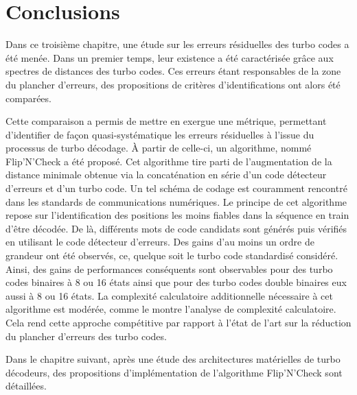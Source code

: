 \section{Conclusions}
Dans ce troisième chapitre, une étude sur les erreurs résiduelles des turbo codes a été menée. Dans un premier temps,
leur existence a été caractérisée grâce aux spectres de distances des turbo codes. Ces erreurs étant responsables de 
la zone du plancher d'erreurs, des propositions de critères d'identifications ont alors été comparées.

Cette comparaison a permis de mettre en exergue une métrique, permettant d'identifier de façon quasi-systématique
les erreurs résiduelles à l'issue du processus de turbo décodage. À partir de celle-ci, un algorithme, nommé Flip'N'Check
a été proposé. Cet algorithme tire parti de l'augmentation de la distance minimale obtenue via la concaténation en série 
d'un code détecteur d'erreurs et d'un turbo code. Un tel schéma de codage est couramment rencontré dans les standards de 
communications numériques. Le principe de cet algorithme repose sur l'identification des positions les moins fiables dans la séquence en train 
d'être décodée. De là, différents mots de code candidats sont générés puis vérifiés en utilisant le code détecteur d'erreurs.
Des gains d'au moins un ordre de grandeur ont été observés, ce, quelque soit le turbo code standardisé considéré. Ainsi, des gains
de performances conséquents sont observables pour des turbo codes binaires à 8 ou 16 états ainsi que pour des turbo codes 
double binaires eux aussi à 8 ou 16 états. La complexité calculatoire additionnelle nécessaire à cet algorithme est modérée,
comme le montre l'analyse de complexité calculatoire.
Cela rend cette approche compétitive par rapport à l’état de l'art sur la réduction du plancher d'erreurs des turbo codes.

Dans le chapitre suivant, après une étude des architectures matérielles de turbo décodeurs, des propositions d'implémentation 
de l'algorithme Flip'N'Check sont détaillées.



